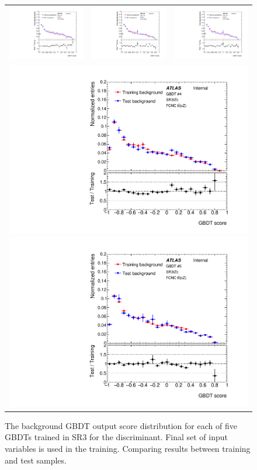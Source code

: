 \begin{figure}[!htbp]
	\centering
	\begin{tabular}{ccc}
		\includegraphics[width=.295\textwidth]{Chapters/CH6/figures/SR3_UsingSMT/BDT/GBDT_background_Fold1} &
		\includegraphics[width=.295\textwidth]{Chapters/CH6/figures/SR3_UsingSMT/BDT/GBDT_background_Fold2} &
		\includegraphics[width=.295\textwidth]{Chapters/CH6/figures/SR3_UsingSMT/BDT/GBDT_background_Fold3} \\
		\multicolumn{3}{c}{
		\includegraphics[width=.295\textwidth]{Chapters/CH6/figures/SR3_UsingSMT/BDT/GBDT_background_Fold4}
		\includegraphics[width=.295\textwidth]{Chapters/CH6/figures/SR3_UsingSMT/BDT/GBDT_background_Fold5}} \\
	\end{tabular}
	\caption{ The background GBDT output score distribution for each of five GBDTs trained in SR3 for the \Dthree discriminant.
		Final set of input variables is used in the training.
		Comparing results between training and test samples.
	}%
	\label{app:BDT:fig:SR3:GBDTbkgFinalSet}
\end{figure}

